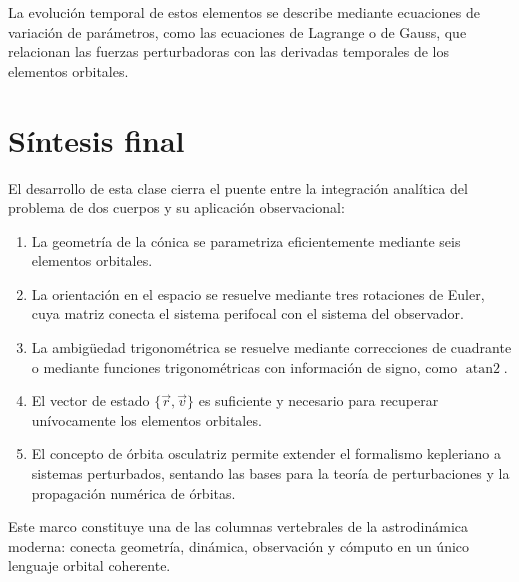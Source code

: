 La evolución temporal de estos elementos se describe mediante ecuaciones de variación de parámetros, como las ecuaciones de Lagrange o de Gauss, que relacionan las fuerzas perturbadoras con las derivadas temporales de los elementos orbitales.

\section{Síntesis final}
El desarrollo de esta clase cierra el puente entre la integración analítica del problema de dos cuerpos y su aplicación observacional:
\begin{enumerate}
    \item La geometría de la cónica se parametriza eficientemente mediante seis elementos orbitales.
    \item La orientación en el espacio se resuelve mediante tres rotaciones de Euler, cuya matriz conecta el sistema perifocal con el sistema del observador.
    \item La ambigüedad trigonométrica se resuelve mediante correcciones de cuadrante o mediante funciones trigonométricas con información de signo, como \(\operatorname{atan2}\).
    \item El vector de estado \(\{\vec{r},\vec{v}\}\) es suficiente y necesario para recuperar unívocamente los elementos orbitales.
    \item El concepto de órbita osculatriz permite extender el formalismo kepleriano a sistemas perturbados, sentando las bases para la teoría de perturbaciones y la propagación numérica de órbitas.
\end{enumerate}

\begin{importante}
Este marco constituye una de las columnas vertebrales de la astrodinámica moderna: conecta geometría, dinámica, observación y cómputo en un único lenguaje orbital coherente.
\end{importante}